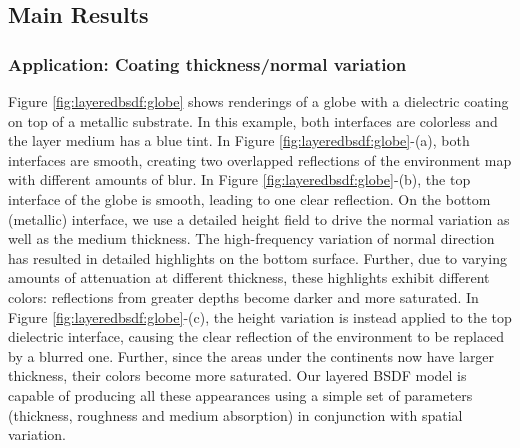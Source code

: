 


\subsection{Main Results}
\label{subsec:res_main}

\subsubsection{Application: Coating thickness/normal variation}

Figure \ref{fig:layeredbsdf:globe} shows renderings of a globe with a dielectric coating on top of a metallic substrate.
In this example, both interfaces are colorless and the layer medium has a blue tint.
In Figure \ref{fig:layeredbsdf:globe}-(a), both interfaces are smooth, creating two overlapped reflections of the environment map with different amounts of blur.
In Figure \ref{fig:layeredbsdf:globe}-(b), the top interface of the globe is smooth, leading to one clear reflection.
On the bottom (metallic) interface, we use a detailed height field to drive the normal variation as well as the medium thickness.
The high-frequency variation of normal direction has resulted in detailed highlights on the bottom surface.
Further, due to varying amounts of attenuation at different thickness, these highlights exhibit different colors: reflections from greater depths become darker and more saturated. 
In Figure \ref{fig:layeredbsdf:globe}-(c), the height variation is instead applied to the top dielectric interface, causing the clear reflection of the environment to be replaced by a blurred one.
Further, since the areas under the continents now have larger thickness, their colors become more saturated.
Our layered BSDF model is capable of producing all these appearances using a simple set of parameters (thickness, roughness and medium absorption) in conjunction with spatial variation.


